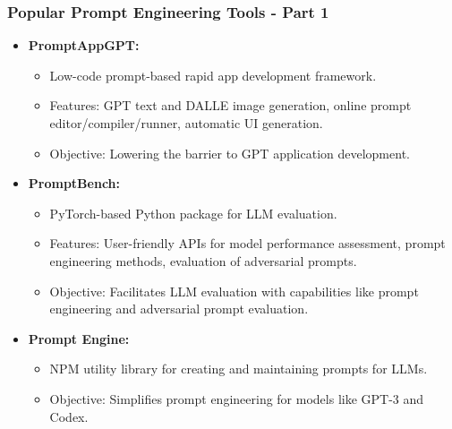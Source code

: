 \begin{frame}[fragile]\frametitle{Popular Prompt Engineering Tools - Part 1}
  \begin{itemize}
    \item \textbf{PromptAppGPT:}
      \begin{itemize}
        \item Low-code prompt-based rapid app development framework.
        \item Features: GPT text and DALLE image generation, online prompt editor/compiler/runner, automatic UI generation.
        \item Objective: Lowering the barrier to GPT application development.
      \end{itemize}
    \item \textbf{PromptBench:}
      \begin{itemize}
        \item PyTorch-based Python package for LLM evaluation.
        \item Features: User-friendly APIs for model performance assessment, prompt engineering methods, evaluation of adversarial prompts.
        \item Objective: Facilitates LLM evaluation with capabilities like prompt engineering and adversarial prompt evaluation.
      \end{itemize}
    \item \textbf{Prompt Engine:}
      \begin{itemize}
        \item NPM utility library for creating and maintaining prompts for LLMs.
        \item Objective: Simplifies prompt engineering for models like GPT-3 and Codex.
      \end{itemize}
  \end{itemize}
\end{frame}

